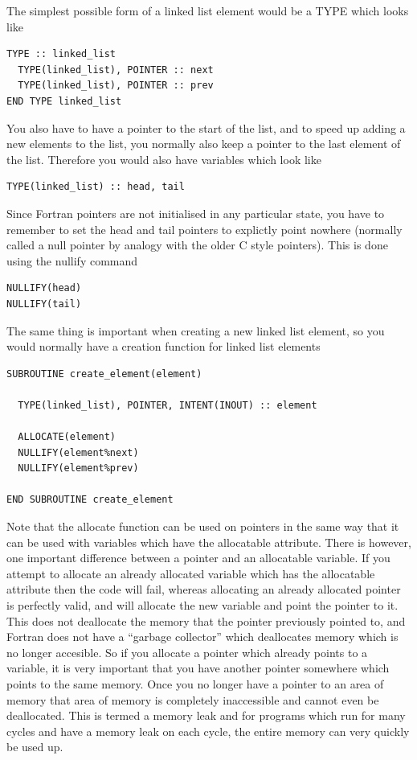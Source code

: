 \documentclass[12pt,a4paper]{article}
\newcommand{\simpleboxverbatim}{\begin{Verbatim}[obeytabs=true,frame=single,
  framerule=0.5mm,rulecolor=\color{warwickmid},formatcom=\color{black}]}
\begin{document}
The simplest possible form of a linked list element would be a TYPE which
looks like

\simpleboxverbatim
TYPE :: linked_list
  TYPE(linked_list), POINTER :: next
  TYPE(linked_list), POINTER :: prev
END TYPE linked_list
\end{Verbatim}

You also have to have a pointer to the start of the list, and to speed up
adding a new elements to the list, you normally also keep a pointer to the
last element of the list. Therefore you would also have variables which look
like
\simpleboxverbatim
TYPE(linked_list) :: head, tail
\end{Verbatim}

Since Fortran pointers are not initialised in any particular state, you have
to remember to set the head and tail pointers to explictly point nowhere
(normally called a null pointer by analogy with the older C style
pointers). This is done using the nullify command
\simpleboxverbatim
NULLIFY(head)
NULLIFY(tail)
\end{Verbatim}

The same thing is important when creating a new linked list element, so you
would normally have a creation function for linked list elements

\simpleboxverbatim
SUBROUTINE create_element(element)

  TYPE(linked_list), POINTER, INTENT(INOUT) :: element

  ALLOCATE(element)
  NULLIFY(element%
  NULLIFY(element%

END SUBROUTINE create_element
\end{Verbatim}
Note that the allocate function can be used on pointers in the same way that
it can be used with variables which have the allocatable attribute. There is
however, one important difference between a pointer and an allocatable
variable. If you attempt to allocate an already allocated variable which has
the allocatable attribute then the code will fail, whereas allocating an
already allocated pointer is perfectly valid, and will allocate the new
variable and point the pointer to it. This does not deallocate the memory that
the pointer previously pointed to, and Fortran does not have a ``garbage
collector'' which deallocates memory which is no longer accesible. So if you
allocate a pointer which already points to a variable, it is very important
that you have another pointer somewhere which points to the same memory. Once
you no longer have a pointer to an area of memory that area of memory is
completely inaccessible and cannot even be deallocated. This is termed a
memory leak and for programs which run for many cycles and have a memory leak
on each cycle, the entire memory can very quickly be used up.
\end{document}
